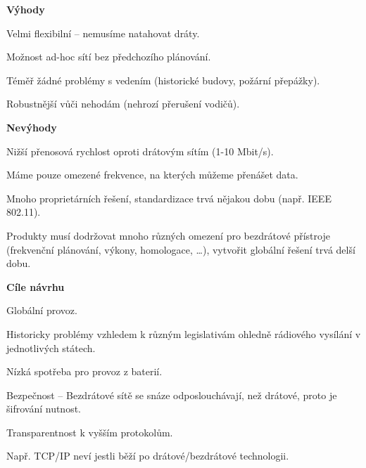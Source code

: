 \begin{compactitem}
    \item \textbf{Výhody} \begin{compactitem}
        \item Velmi flexibilní -- nemusíme natahovat dráty.
        \item Možnost ad-hoc sítí bez předchozího plánování.
        \item Téměř žádné problémy s vedením (historické budovy, požární přepážky).
        \item Robustnější vůči nehodám (nehrozí přerušení vodičů).
    \end{compactitem}

    \item \textbf{Nevýhody} \begin{compactitem}
        \item Nižší přenosová rychlost oproti drátovým sítím (1-10 Mbit/s). \begin{compactitem}
            \item Máme pouze omezené frekvence, na kterých můžeme přenášet data.
        \end{compactitem}
        \item Mnoho proprietárních řešení, standardizace trvá nějakou dobu (např. IEEE 802.11).
        \item Produkty musí dodržovat mnoho různých omezení pro bezdrátové přístroje (frekvenční plánování, výkony, homologace, \dots), vytvořit globální řešení trvá delší dobu.
    \end{compactitem}

    \item \textbf{Cíle návrhu} \begin{compactitem}
        \item Globální provoz. \begin{compactitem}
            \item Historicky problémy vzhledem k různým legislativám ohledně rádiového vysílání v jednotlivých státech.
        \end{compactitem}
        \item Nízká spotřeba pro provoz z baterií.
        \item Bezpečnost -- Bezdrátové sítě se snáze odposlouchávají, než drátové, proto je šifrování nutnost.
        \item Transparentnost k vyšším protokolům. \begin{compactitem}
            \item Např. TCP/IP neví jestli běží po drátové/bezdrátové technologii.
        \end{compactitem}
    \end{compactitem}


\end{compactitem}
